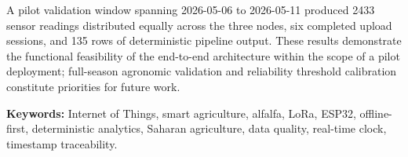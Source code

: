 A pilot validation window spanning 2026-05-06 to 2026-05-11 produced 2433 sensor
readings distributed equally across the three nodes, six completed upload sessions,
and 135 rows of deterministic pipeline output. These results demonstrate the functional
feasibility of the end-to-end architecture within the scope of a pilot deployment;
full-season agronomic validation and reliability threshold calibration constitute
priorities for future work.

\vspace{1em}
\noindent\textbf{Keywords:} Internet of Things, smart agriculture, alfalfa, LoRa,
ESP32, offline-first, deterministic analytics, Saharan agriculture, data quality,
real-time clock, timestamp traceability.
